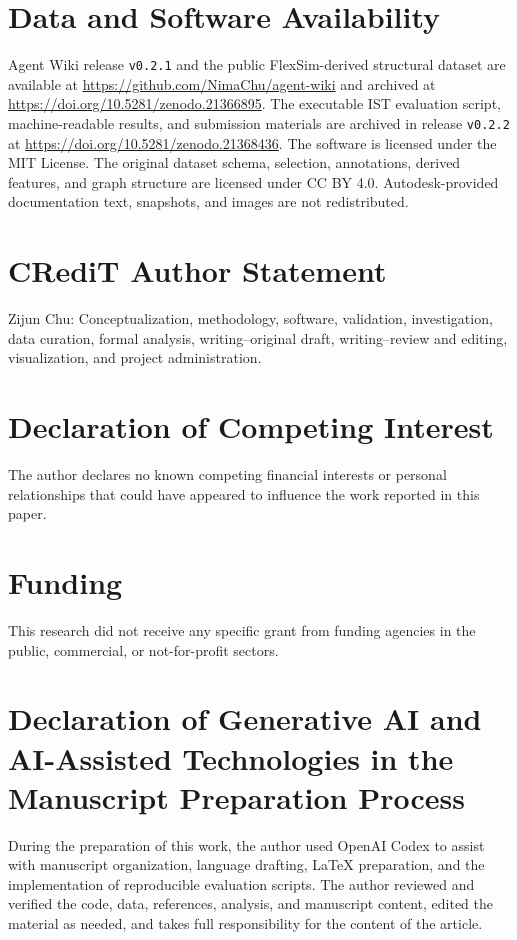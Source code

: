 \documentclass[preprint,12pt,a4paper]{elsarticle}
\begin{document}
\section*{Data and Software Availability}

Agent Wiki release \texttt{v0.2.1} and the public FlexSim-derived structural
dataset are available at \url{https://github.com/NimaChu/agent-wiki} and
archived at \url{https://doi.org/10.5281/zenodo.21366895}. The executable IST
evaluation script, machine-readable results, and submission materials are
archived in release \texttt{v0.2.2} at
\url{https://doi.org/10.5281/zenodo.21368436}. The software is licensed under
the MIT License. The original dataset schema, selection, annotations, derived
features, and graph structure are licensed under CC BY 4.0. Autodesk-provided
documentation text, snapshots, and images are not redistributed.

\section*{CRediT Author Statement}

Zijun Chu: Conceptualization, methodology, software, validation, investigation,
data curation, formal analysis, writing--original draft, writing--review and
editing, visualization, and project administration.

\section*{Declaration of Competing Interest}

The author declares no known competing financial interests or personal
relationships that could have appeared to influence the work reported in this
paper.

\section*{Funding}

This research did not receive any specific grant from funding agencies in the
public, commercial, or not-for-profit sectors.

\section*{Declaration of Generative AI and AI-Assisted Technologies in the Manuscript Preparation Process}

During the preparation of this work, the author used OpenAI Codex to assist
with manuscript organization, language drafting, LaTeX preparation, and the
implementation of reproducible evaluation scripts. The author reviewed and
verified the code, data, references, analysis, and manuscript content, edited
the material as needed, and takes full responsibility for the content of the
article.
\end{document}

